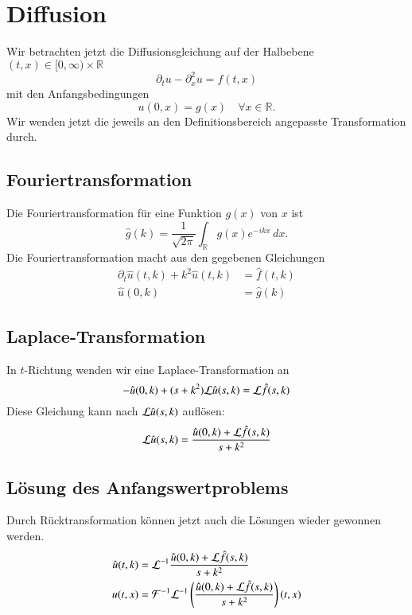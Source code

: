 \section{Diffusion}
Wir betrachten jetzt die Diffusionsgleichung auf der Halbebene
$(t,x)\in[0,\infty)\times \mathbb R$
\[
\partial_tu-\partial_x^2u=f(t,x)
\]
mit den Anfangsbedingungen
\[
u(0,x)=g(x)\quad \forall x\in\mathbb R.
\]
Wir wenden jetzt die jeweils an den Definitionsbereich angepasste
Transformation durch.

\subsection{Fouriertransformation}
Die Fouriertransformation für eine Funktion $g(x)$ von $x$ ist
\[
\hat g(k)=\frac1{\sqrt{2\pi}}\int_{\mathbb R}g(x)e^{-ikx}\,dx.
\]
Die Fouriertransformation macht aus den gegebenen Gleichungen
\begin{align*}
\partial_t \hat u(t,k)+k^2\hat u(t,k)&=\hat f(t,k)\\
\hat u(0,k)&=\hat g(k)
\end{align*}

\subsection{Laplace-Transformation}
In $t$-Richtung wenden wir eine Laplace-Transformation an
\[
-\hat u(0,k)+(s+k^2){\cal L}\hat u(s,k)={\cal L}\hat f(s,k)
\]
Diese Gleichung kann nach ${\cal L}\hat u(s,k)$ auflösen:
\[
{\cal L}\hat u(s,k)=\frac{\hat u(0,k)+{\cal L}\hat f(s,k)}{s+k^2}
\]

\subsection{Lösung des Anfangswertproblems}
Durch Rücktransformation können jetzt auch die Lösungen wieder
gewonnen werden.
\begin{align*}
\hat u(t,k)&={\cal L}^{-1}
\frac{\hat u(0,k)+{\cal L}\hat f(s,k)}{s+k^2}
\\
u(t,x)&={\cal F}^{-1}{\cal L}^{-1}
\left(\frac{\hat u(0,k)+{\cal L}\hat f(s,k)}{s+k^2}\right)(t,x)
\end{align*}

